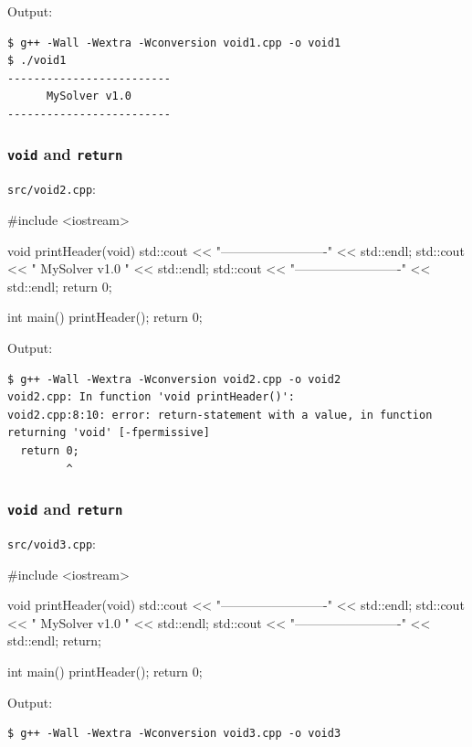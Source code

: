 \documentclass[12pt,letterpaper,twoside]{article}
\begin{document}
Output:

\begin{verbatim}
$ g++ -Wall -Wextra -Wconversion void1.cpp -o void1
$ ./void1
-------------------------
      MySolver v1.0
-------------------------
\end{verbatim}

\subsubsection{\texorpdfstring{\texttt{void} and \texttt{return}}{void and return}}
\texttt{src/void2.cpp}:

\begin{cpp}
#include <iostream>

void printHeader(void) {
  std::cout << "-------------------------" << std::endl;
  std::cout << "      MySolver v1.0      " << std::endl;
  std::cout << "-------------------------" << std::endl;
  return 0;
}

int main() {
  printHeader();
  return 0;
}
\end{cpp}

Output:

\begin{verbatim}
$ g++ -Wall -Wextra -Wconversion void2.cpp -o void2
void2.cpp: In function 'void printHeader()':
void2.cpp:8:10: error: return-statement with a value, in function returning 'void' [-fpermissive]
  return 0;
         ^
\end{verbatim}

\subsubsection{\texorpdfstring{\texttt{void} and \texttt{return}}{void and return}}
\texttt{src/void3.cpp}:

\begin{cpp}
#include <iostream>

void printHeader(void) {
  std::cout << "-------------------------" << std::endl;
  std::cout << "      MySolver v1.0      " << std::endl;
  std::cout << "-------------------------" << std::endl;
  return;
}

int main() {
  printHeader();
  return 0;
}
\end{cpp}

Output:

\begin{verbatim}
$ g++ -Wall -Wextra -Wconversion void3.cpp -o void3
\end{verbatim}
\end{document}
